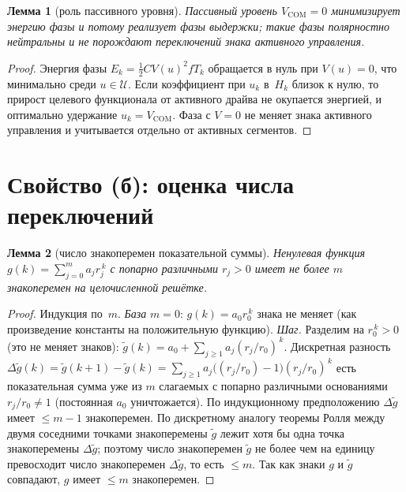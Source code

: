 \documentclass[12pt,a4paper]{article}
\theoremstyle{plain}
\newtheorem{lemma}{Лемма}
\theoremstyle{definition}\newtheorem{remark}{Замечание}
\newcommand{\Ueff}{\mathcal{U}}
\begin{document}
\begin{lemma}[роль пассивного уровня]\label{lem:vcom}
Пассивный уровень $V_{\mathrm{COM}}=0$ минимизирует энергию фазы и потому реализует
фазы выдержки; такие фазы полярностно нейтральны и не порождают переключений знака
активного управления.
\end{lemma}
\begin{proof}
Энергия фазы $E_k=\tfrac12 C V(u)^2 f T_k$ обращается в нуль при $V(u)=0$, что
минимально среди $u\in\Ueff$. Если коэффициент при $u_k$ в~$H_k$ близок к нулю, то
прирост целевого функционала от активного драйва не окупается энергией, и оптимально
удержание $u_k=V_{\mathrm{COM}}$. Фаза с $V=0$ не меняет знака активного управления и
учитывается отдельно от активных сегментов. \end{proof}


\section{Свойство (б): оценка числа переключений}

\begin{lemma}[число знакоперемен показательной суммы]\label{lem:sc}
Ненулевая функция $g(k)=\sum_{j=0}^{m} a_j r_j^{\,k}$ с попарно различными $r_j>0$
имеет не более $m$ знакоперемен на целочисленной решётке.
\end{lemma}
\begin{proof}
Индукция по~$m$. \emph{База} $m=0$: $g(k)=a_0 r_0^{\,k}$ знака не меняет (как
произведение константы на положительную функцию). \emph{Шаг.} Разделим на
$r_0^{\,k}>0$ (это не меняет знаков): $\tilde g(k)=a_0+\sum_{j\ge1}a_j(r_j/r_0)^{\,k}$.
Дискретная разность $\Delta\tilde g(k)=\tilde g(k{+}1)-\tilde g(k)
=\sum_{j\ge1}a_j\bigl((r_j/r_0)-1\bigr)(r_j/r_0)^{\,k}$ есть показательная сумма уже из
$m$ слагаемых с попарно различными основаниями $r_j/r_0\ne1$ (постоянная $a_0$
уничтожается). По индукционному предположению $\Delta\tilde g$ имеет $\le m-1$
знакоперемен. По дискретному аналогу теоремы Ролля между двумя соседними точками
знакоперемены $\tilde g$ лежит хотя бы одна точка знакоперемены $\Delta\tilde g$;
поэтому число знакоперемен $\tilde g$ не более чем на единицу превосходит число
знакоперемен $\Delta\tilde g$, то есть $\le m$. Так как знаки $g$ и $\tilde g$
совпадают, $g$ имеет $\le m$ знакоперемен. \end{proof}
\end{document}
